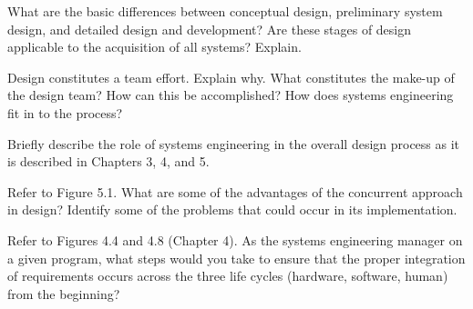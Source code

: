 \begin{exercises}
    \begin{exercise}
    \label{sea-05-01}
        What are the basic differences between conceptual design, preliminary system design, and detailed design and development? Are these stages of design applicable to the acquisition of all systems? Explain.
    \end{exercise}
    \begin{solution}
    \end{solution}
    
    \begin{exercise}
    \label{sea-05-02}
        Design constitutes a team effort. Explain why. What constitutes the make-up of the design team? How can this be accomplished? How does systems engineering fit in to the process?
    \end{exercise}
    \begin{solution}
    \end{solution}
    
    \begin{exercise}
    \label{sea-05-03}
        Briefly describe the role of systems engineering in the overall design process as it is described in Chapters 3, 4, and 5.
    \end{exercise}
    \begin{solution}
    \end{solution}
    
    \begin{exercise}
    \label{sea-05-04}
        Refer to Figure 5.1. What are some of the advantages of the concurrent approach in design? Identify some of the problems that could occur in its implementation.
    \end{exercise}
    \begin{solution}
    \end{solution}
    
    \begin{exercise}
    \label{sea-05-05}
        Refer to Figures 4.4 and 4.8 (Chapter 4). As the systems engineering manager on a given program, what steps would you take to ensure that the proper integration of requirements occurs across the three life cycles (hardware, software, human) from the beginning?
    \end{exercise}
    \begin{solution}
    \end{solution}
    

\end{exercises}
